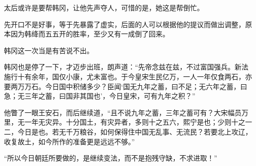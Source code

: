 太后或许是要帮韩冈，让他先声夺人，可惜的是，她这是帮倒忙。

先开口不是好事，等于先暴露了虚实，后面的人可以根据他的提议而做出调整，原本因为韩绛而五五开的胜率，至少又有一成倒了回来。

韩冈这一次当是有苦说不出。

韩冈也是停了一下，才迈步出班，朗声道：“先帝念兹在兹，不过富国强兵。新法施行十有余年，国仅小康，尤未富也。于今皇宋生民亿万，一人一年仅食两石，亦要两万万石。今日国中积储多少？臣闻‘国无九年之蓄，曰不足；无六年之蓄，曰急；无三年之蓄，曰国非其国也’，今日皇宋，可有九年之积？”

他瞥了一眼王安石，而后继续道，“且不说九年之蓄，三年之蓄可有？大宋幅员万里，无一年无灾异。十分国土，有灾异者，多则十之五六，熙宁是也；少则十之一二，今日是也。若无千万粮谷，如何保得住中国无乱事、无流民？若要北上攻辽，收复故土，如今所作的准备更是远远不够。”

“所以今日朝廷所要做的，是继续变法，而不是抱残守缺，不求进取！”

